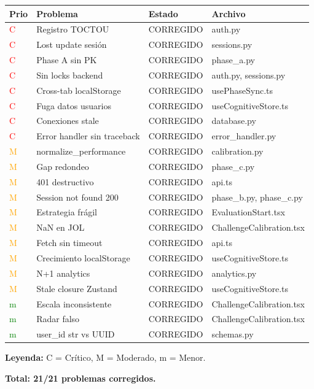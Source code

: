 \documentclass[12pt,a4paper]{article}
\begin{document}
\begin{center}
\begin{tabular}{p{0.8cm}p{4.5cm}p{3cm}p{5cm}}
\toprule
\textbf{Prio} & \textbf{Problema} & \textbf{Estado} & \textbf{Archivo} \\
\midrule
\textcolor{red}{C} & Registro TOCTOU & CORREGIDO & auth.py \\
\textcolor{red}{C} & Lost update sesión & CORREGIDO & sessions.py \\
\textcolor{red}{C} & Phase A sin PK & CORREGIDO & phase\_a.py \\
\textcolor{red}{C} & Sin locks backend & CORREGIDO & auth.py, sessions.py \\
\textcolor{red}{C} & Cross-tab localStorage & CORREGIDO & usePhaseSync.ts \\
\textcolor{red}{C} & Fuga datos usuarios & CORREGIDO & useCognitiveStore.ts \\
\textcolor{red}{C} & Conexiones stale & CORREGIDO & database.py \\
\textcolor{red}{C} & Error handler sin traceback & CORREGIDO & error\_handler.py \\
\textcolor{orange}{M} & normalize\_performance & CORREGIDO & calibration.py \\
\textcolor{orange}{M} & Gap redondeo & CORREGIDO & phase\_c.py \\
\textcolor{orange}{M} & 401 destructivo & CORREGIDO & api.ts \\
\textcolor{orange}{M} & Session not found 200 & CORREGIDO & phase\_b.py, phase\_c.py \\
\textcolor{orange}{M} & Estrategia frágil & CORREGIDO & EvaluationStart.tsx \\
\textcolor{orange}{M} & NaN en JOL & CORREGIDO & ChallengeCalibration.tsx \\
\textcolor{orange}{M} & Fetch sin timeout & CORREGIDO & api.ts \\
\textcolor{orange}{M} & Crecimiento localStorage & CORREGIDO & useCognitiveStore.ts \\
\textcolor{orange}{M} & N+1 analytics & CORREGIDO & analytics.py \\
\textcolor{orange}{M} & Stale closure Zustand & CORREGIDO & useCognitiveStore.ts \\
\textcolor{green}{m} & Escala inconsistente & CORREGIDO & ChallengeCalibration.tsx \\
\textcolor{green}{m} & Radar falso & CORREGIDO & ChallengeCalibration.tsx \\
\textcolor{green}{m} & user\_id str vs UUID & CORREGIDO & schemas.py \\
\bottomrule
\end{tabular}
\end{center}

\vspace{1cm}
\noindent\textbf{Leyenda:} C = Crítico, M = Moderado, m = Menor.

\vspace{0.5cm}
\noindent\textbf{Total: 21/21 problemas corregidos.}
\end{document}
